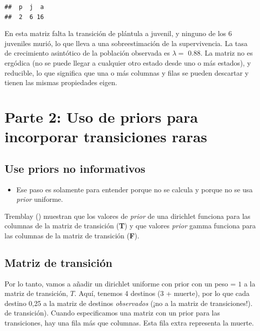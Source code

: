 \documentclass[
]{book}
\providecommand{\tightlist}{%
  \setlength{\itemsep}{0pt}\setlength{\parskip}{0pt}}
\theoremstyle{definition}
\theoremstyle{definition}
\theoremstyle{definition}
\theoremstyle{definition}
\theoremstyle{remark}
\begin{document}
\begin{verbatim}
##  p  j  a 
##  2  6 16
\end{verbatim}

En esta matriz falta la transición de plántula a juvenil, y ninguno de
los 6 juveniles murió, lo que lleva a una sobreestimación de la
supervivencia. La tasa de crecimiento asintótico de la población
observada es \(\lambda =\) 0.88.
La matriz no es ergódica (no se puede llegar a cualquier otro estado
desde uno o más estados), y reducible, lo que significa que una o más
columnas y filas se pueden descartar y tienen las mismas propiedades
eigen.

\hypertarget{parte-2-uso-de-priors-para-incorporar-transiciones-raras}{%
\section{Parte 2: Uso de priors para incorporar transiciones raras}\label{parte-2-uso-de-priors-para-incorporar-transiciones-raras}}

\hypertarget{use-priors-no-informativos}{%
\subsection{Use priors no informativos}\label{use-priors-no-informativos}}

\begin{itemize}
\tightlist
\item
  Ese paso es solamente para entender porque no se calcula y porque no
  se usa \emph{prior} uniforme.
\end{itemize}

Tremblay (\citet{tremblay2021population}) muestran que los valores de \emph{prior}
de una dirichlet funciona para las columnas de la matriz de transición
(\textbf{T}) y que valores \emph{prior} gamma funciona para las columnas de la
matriz de transición (\textbf{F}).

\hypertarget{matriz-de-transiciuxf3n}{%
\subsection{Matriz de transición}\label{matriz-de-transiciuxf3n}}

Por lo tanto, vamos a añadir un dirichlet uniforme con prior con un peso
= \(1\) a la matriz de transición, \(T\). Aquí, tenemos 4 destinos (3 +
muerte), por lo que cada destino 0,25 a la matriz de destinos
\emph{observados} (¡no a la matriz de transiciones!). de transición). Cuando
especificamos una matriz con un prior para las transiciones, hay una
fila más que columnas. Esta fila extra representa la muerte.
\end{document}
